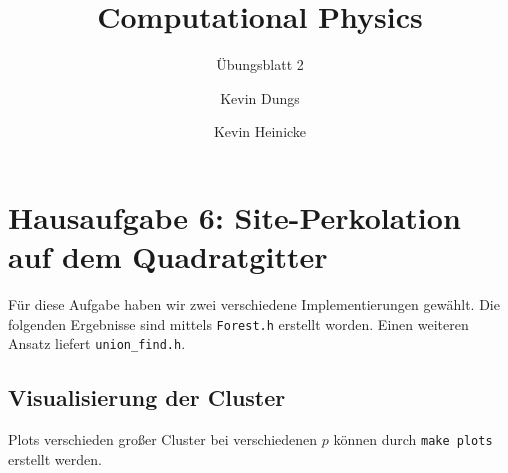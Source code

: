 \documentclass{scrartcl}
\author{Kevin Dungs \and Kevin Heinicke}
\title{Computational Physics}
\subtitle{Übungsblatt 2}
\begin{document}
\maketitle

\section*{Hausaufgabe 6: Site-Perkolation auf dem Quadratgitter}

Für diese Aufgabe haben wir zwei verschiedene Implementierungen gewählt. Die folgenden Ergebnisse sind mittels
\texttt{Forest.h} erstellt worden. Einen weiteren Ansatz liefert \texttt{union\_find.h}.

\subsection*{Visualisierung der Cluster}

Plots verschieden großer Cluster bei verschiedenen $p$ können durch \texttt{make plots} erstellt werden. 
\end{document}
